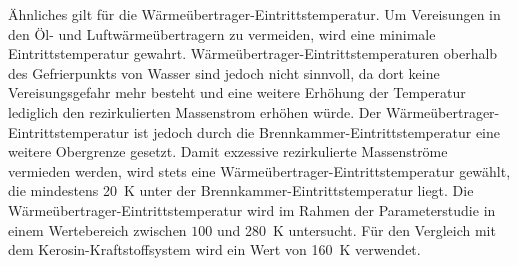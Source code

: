 Ähnliches gilt für die Wärmeübertrager-Eintrittstemperatur. Um Vereisungen in den Öl- und Luftwärmeübertragern zu vermeiden, wird eine minimale Eintrittstemperatur gewahrt. Wärmeübertrager-Eintrittstemperaturen oberhalb des Gefrierpunkts von Wasser sind jedoch nicht sinnvoll, da dort keine Vereisungsgefahr mehr besteht und eine weitere Erhöhung der Temperatur lediglich den rezirkulierten Massenstrom erhöhen würde. Der Wärmeübertrager-Eintrittstemperatur ist jedoch durch die Brennkammer-Eintrittstemperatur eine weitere Obergrenze gesetzt. Damit exzessive rezirkulierte Massenströme vermieden werden, wird stets eine Wärmeübertrager-Eintrittstemperatur gewählt, die mindestens \SI{20}{\K} unter der Brennkammer-Eintrittstemperatur liegt. Die Wärmeübertrager-Eintrittstemperatur wird im Rahmen der Parameterstudie in einem Wertebereich zwischen $100$ und \SI{280}{\K} untersucht. Für den Vergleich mit dem Kerosin-Kraftstoffsystem wird ein Wert von \SI{160}{\K} verwendet.


